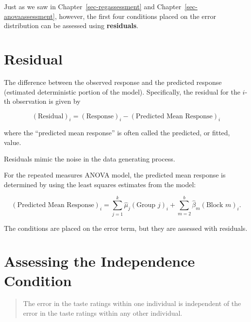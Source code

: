 \documentclass[
  letterpaper,
  DIV=11,
  numbers=noendperiod]{scrreprt}
\theoremstyle{definition}
\theoremstyle{definition}
\theoremstyle{plain}
\theoremstyle{remark}
\begin{document}
Just as we saw in Chapter~\ref{sec-regassessment} and
Chapter~\ref{sec-anovaassessment}, however, the first four conditions
placed on the error distribution can be assessed using
\textbf{residuals}.

\section{Residual}\label{residual-2}

The difference between the observed response and the predicted response
(estimated deterministic portion of the model). Specifically, the
residual for the \(i\)-th observation is given by

\[(\text{Residual})_i = (\text{Response})_i - (\text{Predicted Mean Response})_i\]

where the ``predicted mean response'' is often called the predicted, or
fitted, value.

Residuals mimic the noise in the data generating process.

For the repeated measures ANOVA model, the predicted mean response is
determined by using the least squares estimates from the model:

\[(\text{Predicted Mean Response})_i = \sum_{j=1}^{k} \widehat{\mu}_j (\text{Group } j)_i + \sum_{m=2}^{b} \widehat{\beta}_m (\text{Block } m)_i.\]

\begin{tcolorbox}[enhanced jigsaw, colbacktitle=quarto-callout-tip-color!10!white, colback=white, left=2mm, title=\textcolor{quarto-callout-tip-color}{\faLightbulb}\hspace{0.5em}{Big Idea}, toptitle=1mm, leftrule=.75mm, breakable, bottomrule=.15mm, arc=.35mm, rightrule=.15mm, toprule=.15mm, coltitle=black, opacityback=0, colframe=quarto-callout-tip-color-frame, opacitybacktitle=0.6, bottomtitle=1mm, titlerule=0mm]

The conditions are placed on the error term, but they are assessed with
residuals.

\end{tcolorbox}

\section{Assessing the Independence
Condition}\label{assessing-the-independence-condition-2}

\begin{quote}
The error in the taste ratings within one individual is independent of
the error in the taste ratings within any other individual.
\end{quote}
\end{document}
